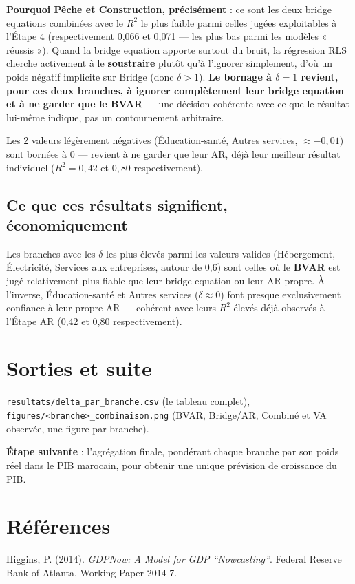 \documentclass[11pt,a4paper]{article}
\begin{document}
\begin{alertebox}
\textbf{Pourquoi Pêche et Construction, précisément} : ce sont les deux bridge equations combinées avec le $R^2$ le plus faible parmi celles jugées exploitables à l'Étape 4 (respectivement 0,066 et 0,071 --- les plus bas parmi les modèles « réussis »). Quand la bridge equation apporte surtout du bruit, la régression RLS cherche activement à le \textbf{soustraire} plutôt qu'à l'ignorer simplement, d'où un poids négatif implicite sur Bridge (donc $\delta>1$). \textbf{Le bornage à $\delta=1$ revient, pour ces deux branches, à ignorer complètement leur bridge equation et à ne garder que le BVAR} --- une décision cohérente avec ce que le résultat lui-même indique, pas un contournement arbitraire.

Les 2 valeurs légèrement négatives (Éducation-santé, Autres services, $\approx-0{,}01$) sont bornées à 0 --- revient à ne garder que leur AR, déjà leur meilleur résultat individuel ($R^2=0{,}42$ et $0{,}80$ respectivement).
\end{alertebox}

\subsection{Ce que ces résultats signifient, économiquement}

\begin{intuition}
Les branches avec les $\delta$ les plus élevés parmi les valeurs valides (Hébergement, Électricité, Services aux entreprises, autour de 0,6) sont celles où le \textbf{BVAR} est jugé relativement plus fiable que leur bridge equation ou leur AR propre. À l'inverse, Éducation-santé et Autres services ($\delta\approx0$) font presque exclusivement confiance à leur propre AR --- cohérent avec leurs $R^2$ élevés déjà observés à l'Étape AR (0,42 et 0,80 respectivement).
\end{intuition}

\section{Sorties et suite}

\texttt{resultats/delta\_par\_branche.csv} (le tableau complet), \texttt{figures/<branche>\_combinaison.png} (BVAR, Bridge/AR, Combiné et VA observée, une figure par branche).

\textbf{Étape suivante} : l'agrégation finale, pondérant chaque branche par son poids réel dans le PIB marocain, pour obtenir une unique prévision de croissance du PIB.

\section*{Références}
\begin{enumerate}[leftmargin=1.6em, label=\textbf{[\arabic*]}]
\item \hypertarget{ref1}{} Higgins, P. (2014). \textit{GDPNow: A Model for GDP ``Nowcasting''}. Federal Reserve Bank of Atlanta, Working Paper 2014-7.
\end{enumerate}
\end{document}
